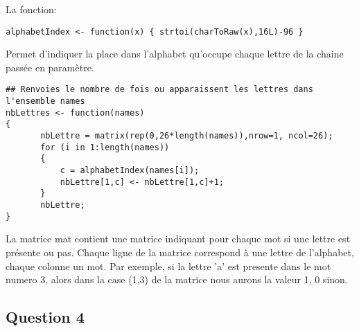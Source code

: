 \documentclass[a4paper,12pt]{report}
\begin{document}
La fonction:

\begin{lstlisting}
alphabetIndex <- function(x) { strtoi(charToRaw(x),16L)-96 }
\end{lstlisting}

Permet d'indiquer la place dans l'alphabet qu'occupe chaque lettre de la chaine passée en paramètre.

\begin{lstlisting}
## Renvoies le nombre de fois ou apparaissent les lettres dans l'ensemble names
nbLettres <- function(names)
{
       nbLettre = matrix(rep(0,26*length(names)),nrow=1, ncol=26);
       for (i in 1:length(names))
       {
           c = alphabetIndex(names[i]);
           nbLettre[1,c] <- nbLettre[1,c]+1;
       }
       nbLettre;
}

\end{lstlisting}

La matrice mat contient une matrice indiquant pour chaque mot si une lettre est présente ou pas. Chaque ligne de la matrice correspond à une lettre de l'alphabet, chaque colonne un mot. Par exemple, si la lettre 'a' est presente dans le mot numero 3, alors dans la case (1,3) de la matrice nous aurons la valeur 1, 0 sinon.

\newpage

\subsection*{Question 4}
\end{document}

